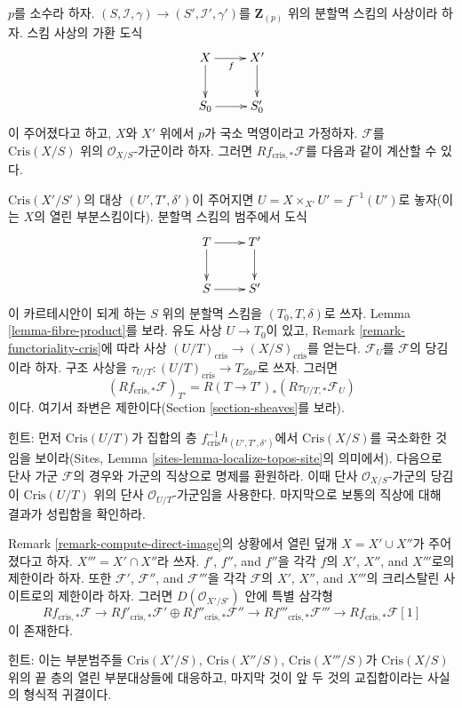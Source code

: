 \begin{remark}[고차 직상]
\label{remark-compute-direct-image}
$p$를 소수라 하자.
$(S, \mathcal{I}, \gamma) \to (S', \mathcal{I}', \gamma')$를
$\mathbf{Z}_{(p)}$ 위의 분할멱 스킴의 사상이라 하자. 스킴 사상의
가환 도식
$$
\xymatrix{
X \ar[r]_f \ar[d] & X' \ar[d] \\
S_0 \ar[r] & S'_0
}
$$
이 주어졌다고 하고, $X$와 $X'$ 위에서 $p$가 국소 멱영이라고
가정하자. $\mathcal{F}$를 $\text{Cris}(X/S)$ 위의
$\mathcal{O}_{X/S}$-가군이라 하자. 그러면
$Rf_{\text{cris}, *}\mathcal{F}$를 다음과 같이 계산할 수 있다.

\medskip\noindent
$\text{Cris}(X'/S')$의 대상 $(U', T', \delta')$이 주어지면
$U = X \times_{X'} U' = f^{-1}(U')$로 놓자(이는 $X$의 열린
부분스킴이다). 분할멱 스킴의 범주에서 도식
$$
\xymatrix{
T \ar[r] \ar[d] & T' \ar[d] \\
S \ar[r] & S'
}
$$
이 카르테시안이 되게 하는 $S$ 위의 분할멱 스킴을
$(T_0, T, \delta)$로 쓰자. Lemma \ref{lemma-fibre-product}를 보라.
유도 사상 $U \to T_0$이 있고, Remark
\ref{remark-functoriality-cris}에 따라 사상
$(U/T)_{\text{cris}} \to (X/S)_{\text{cris}}$를 얻는다.
$\mathcal{F}_U$를 $\mathcal{F}$의 당김이라 하자. 구조 사상을
$\tau_{U/T} : (U/T)_{\text{cris}} \to T_{Zar}$로 쓰자. 그러면
\begin{equation}
\label{equation-identify-pushforward}
\left(Rf_{\text{cris}, *}\mathcal{F}\right)_{T'} =
R(T \to T')_*\left(R\tau_{U/T, *} \mathcal{F}_U \right)
\end{equation}
이다. 여기서 좌변은 제한이다(Section \ref{section-sheaves}를 보라).

\medskip\noindent
힌트: 먼저 $\text{Cris}(U/T)$가 집합의 층
$f_{\text{cris}}^{-1}h_{(U', T', \delta')}$에서
$\text{Cris}(X/S)$를 국소화한 것임을 보이라(Sites, Lemma
\ref{sites-lemma-localize-topos-site}의 의미에서). 다음으로 단사
가군 $\mathcal{F}$의 경우와 가군의 직상으로 명제를 환원하라.
이때 단사 $\mathcal{O}_{X/S}$-가군의 당김이
$\text{Cris}(U/T)$ 위의 단사 $\mathcal{O}_{U/T}$-가군임을 사용한다.
마지막으로 보통의 직상에 대해 결과가 성립함을 확인하라.
\end{remark}

\begin{remark}
\label{remark-mayer-vietoris}
Remark \ref{remark-compute-direct-image}의 상황에서 열린 덮개
$X = X' \cup X''$가 주어졌다고 하자. $X''' = X' \cap X''$라 쓰자.
$f'$, $f''$, and $f''$을 각각 $f$의 $X'$, $X''$, and $X'''$로의
제한이라 하자. 또한 $\mathcal{F}'$, $\mathcal{F}''$, and
$\mathcal{F}'''$을 각각 $\mathcal{F}$의 $X'$, $X''$, and $X'''$의
크리스탈린 사이트로의 제한이라 하자. 그러면
$D(\mathcal{O}_{X'/S'})$ 안에 특별 삼각형
$$
Rf_{\text{cris}, *}\mathcal{F}
\longrightarrow
Rf'_{\text{cris}, *}\mathcal{F}' \oplus Rf''_{\text{cris}, *}\mathcal{F}''
\longrightarrow
Rf'''_{\text{cris}, *}\mathcal{F}'''
\longrightarrow
Rf_{\text{cris}, *}\mathcal{F}[1]
$$
이 존재한다.

\medskip\noindent
힌트: 이는 부분범주들 $\text{Cris}(X'/S)$,
$\text{Cris}(X''/S)$, $\text{Cris}(X'''/S)$가
$\text{Cris}(X/S)$ 위의 끝 층의 열린 부분대상들에 대응하고,
마지막 것이 앞 두 것의 교집합이라는 사실의 형식적 귀결이다.
\end{remark}

